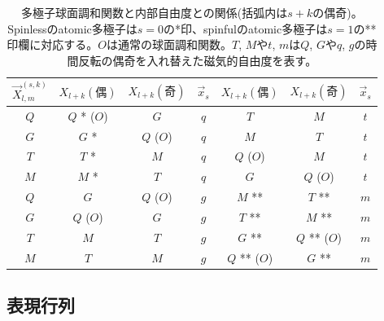 \documentclass[11pt]{easymemo}
\begin{document}
\begin{table}[t!]
\caption{多極子球面調和関数と内部自由度との関係(括弧内は$s+k$の偶奇)。Spinlessのatomic多極子は$s=0$の*印、spinfulのatomic多極子は$s=1$の**印欄に対応する。$O$は通常の球面調和関数。$T$, $M$や$t$, $m$は$Q$, $G$や$q$, $g$の時間反転の偶奇を入れ替えた磁気的自由度を表す。
\label{tbl:mshint}}
\begin{center}
\begin{tabular}{c|ccc|ccc} \hline\hline
$\vec{X}_{l,m}^{(s,k)}$ & $X_{l+k}(偶)$ & $X_{l+k}(奇)$ & $\vec{x}_{s}$ & $X_{l+k}(偶)$ & $X_{l+k}(奇)$ & $\vec{x}_{s}$ \\ \hline
$Q$ & $Q$ * ($O$) & $G$ & $q$ & $T$ & $M$ & $t$ \\
$G$ & $G$ * & $Q$ ($O$) & $q$ & $M$ & $T$ & $t$ \\
$T$ & $T$ * & $M$ & $q$ & $Q$ ($O$) & $M$ & $t$ \\
$M$ & $M$ * & $T$ & $q$ & $G$ & $Q$ ($O$) & $t$ \\
\hline
$Q$ & $G$ & $Q$ ($O$) & $g$ & $M$ ** & $T$ ** & $m$ \\
$G$ & $Q$ ($O$) & $G$ & $g$ & $T$ ** & $M$ ** & $m$ \\
$T$ & $M$ & $T$ & $g$ & $G$ ** & $Q$ ** ($O$) & $m$ \\
$M$ & $T$ & $M$ & $g$ & $Q$ ** ($O$) & $G$ ** & $m$ \\
\hline\hline
\end{tabular}
\end{center}
\end{table}



\subsection{表現行列}
\end{document}
